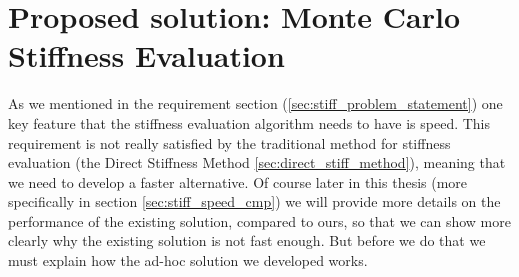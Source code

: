 \section{Proposed solution: Monte Carlo Stiffness Evaluation}

As we mentioned in the requirement section (\ref{sec:stiff_problem_statement}) one key 
feature that the stiffness evaluation algorithm needs to have is speed.
This requirement is not really satisfied by the traditional method for stiffness
evaluation (the Direct Stiffness Method \ref{sec:direct_stiff_method}),
meaning that we need to develop a faster alternative.
Of course later in this thesis (more specifically in section \ref{sec:stiff_speed_cmp})
we will provide more details on the performance of the existing solution, compared to
ours, so that we can show more clearly why the existing solution is not fast enough.
But before we do that we must explain how the ad-hoc solution we developed works.

